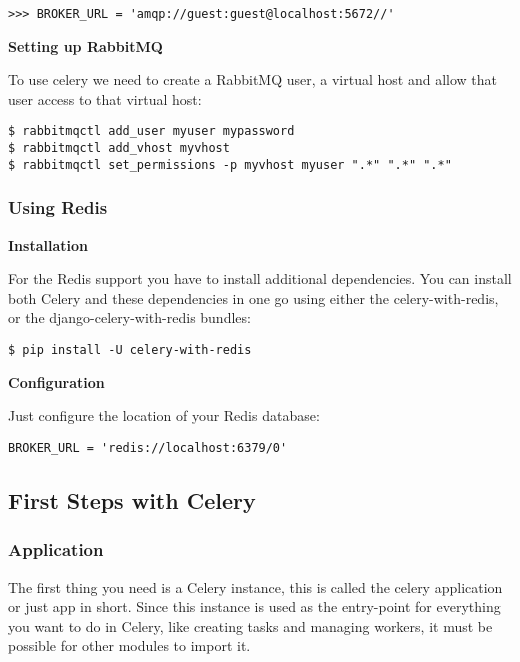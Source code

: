 \documentclass[9pt,a4paper]{article}
\begin{document}
\begin{CJK*}{GBK}{kai}
\begin{Verbatim}[frame=single]
>>> BROKER_URL = 'amqp://guest:guest@localhost:5672//'
\end{Verbatim}

\textbf{Setting up RabbitMQ}

To use celery we need to create a RabbitMQ user, a virtual host and allow that user access to that virtual host:

\begin{Verbatim}[frame=single]
$ rabbitmqctl add_user myuser mypassword
$ rabbitmqctl add_vhost myvhost
$ rabbitmqctl set_permissions -p myvhost myuser ".*" ".*" ".*"
\end{Verbatim}

\subsubsection{Using Redis}

\textbf{Installation}

For the Redis support you have to install additional dependencies. You can install both Celery and these dependencies in one go using either the celery-with-redis, or the django-celery-with-redis bundles:

\begin{Verbatim}[frame=single]
$ pip install -U celery-with-redis
\end{Verbatim}

\begin{flushleft}
\textbf{Configuration}
\end{flushleft}

Just configure the location of your Redis database:

\begin{Verbatim}[frame=single]
BROKER_URL = 'redis://localhost:6379/0'
\end{Verbatim}

\subsection{First Steps with Celery}

\subsubsection{Application}
The first thing you need is a Celery instance, this is called the celery application or just app in short. Since this instance is used as the entry-point for everything you want to do in Celery, like creating tasks and managing workers, it must be possible for other modules to import it.


\end{CJK*}
\end{document}
